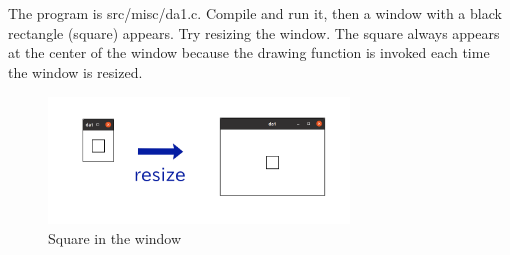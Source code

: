 The program is src/misc/da1.c. Compile and run it, then a window with a
black rectangle (square) appears. Try resizing the window. The square
always appears at the center of the window because the drawing function
is invoked each time the window is resized.

\begin{figure}
\centering
\includegraphics[width=8cm,height=3.4cm]{../image/da1.png}
\caption{Square in the window}
\end{figure}
